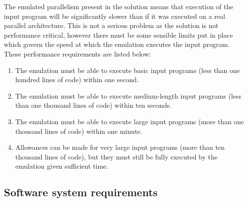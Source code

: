 \documentclass[a4paper, 12pt]{article}
\begin{document}
The emulated parallelism present in the solution means that execution of the input program will be significantly slower than if it was executed on a real parallel architecture. This is not a serious problem as the solution is not performance critical, however there must be some sensible limits put in place which govern the speed at which the emulation executes the input program. These performance requirements are listed below:
\begin{enumerate}[leftmargin=*,labelindent=15pt,label=\bfseries 3.\arabic*] 
	\item The emulation must be able to execute basic input programs (less than one hundred lines of code) within one second.
	\item The emulation must be able to execute medium-length input programs (less than one thousand lines of code) within ten seconds.
	\item The emulation must be able to execute large input programs (more than one thousand lines of code) within one minute.
	\item Allowances can be made for very large input programs (more than ten thousand lines of code), but they must still be fully executed by the emulation given sufficient time.
\end{enumerate}

\subsection{Software system requirements}
\label{sec:req_soft}
\end{document}
